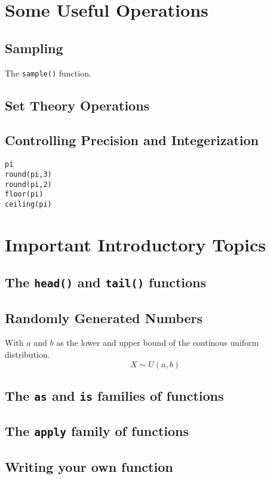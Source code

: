 \documentclass[a4paper,12pt]{article}
\begin{document}
\begin{itemize}
\begin{itemize}
\section{Some Useful Operations}
\subsection{Sampling}

The \texttt{sample()} function.

\subsection{Set Theory Operations}

\subsection{Controlling Precision and Integerization}
\begin{framed}
\begin{verbatim}
pi
round(pi,3)
round(pi,2)
floor(pi)
ceiling(pi)
\end{verbatim}
\end{framed}


\section{Important Introductory Topics}
\subsection{The \texttt{head()} and \texttt{tail()} functions}
\subsection{Randomly Generated Numbers}
With $a$ and $b$ as the lower and upper bound of the continous uniform distribution.
\[X \sim U(a,b)\]
\subsection{The \texttt{as} and \texttt{is} families of functions}
\subsection{The \texttt{apply} family of functions}
\subsection{Writing your own function}



\end{itemize}
\end{itemize}
\end{document}
